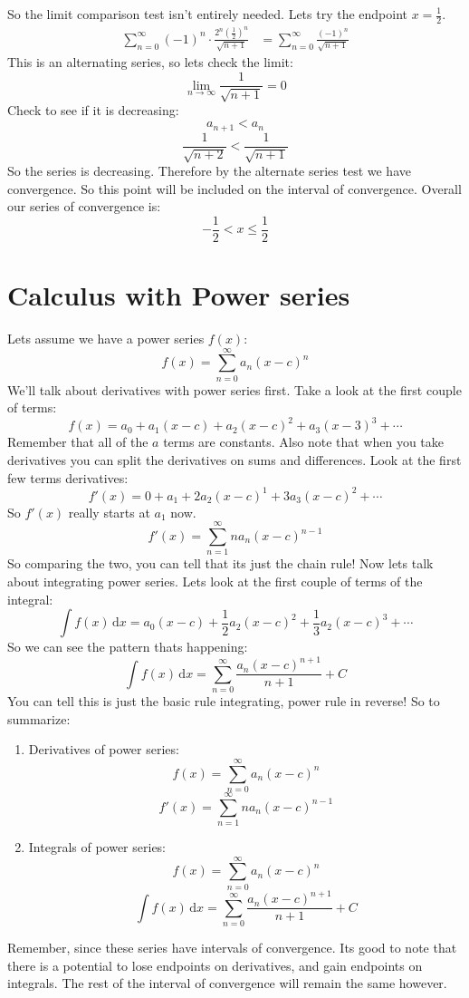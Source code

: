 \documentclass{article}
\begin{document}
        So the limit comparison test isn't entirely needed. 
        Lets try the endpoint \(x = \frac{1}{2}\).
        \begin{align*}
            \sum_{n=0}^{\infty} (-1)^n \cdot \frac{2^n(\frac{1}{2})^n}{\sqrt{n+1}}
            &= \sum_{n=0}^{\infty} \frac{(-1)^n}{\sqrt{n+1}}
        \end{align*}
        This is an alternating series, so lets check the limit:
        \[\lim_{n \to \infty} \frac{1}{\sqrt{n+1}} = 0\]
        Check to see if it is decreasing:
        \[a_{n+1} < a_n\]
        \[\frac{1}{\sqrt{n+2}} < \frac{1}{\sqrt{n+1}}\]
        So the series is decreasing. 
        Therefore by the alternate series test we have convergence.
        So this point will be included on the interval of convergence.
        Overall our series of convergence is:
        \[- \frac{1}{2} < x \leq \frac{1}{2}\]

\section{Calculus with Power series}
    Lets assume we have a power series \(f(x)\):
    \[f(x) = \sum_{n=0}^{\infty} a_n (x-c)^n\]
    We'll talk about derivatives with power series first.
    Take a look at the first couple of terms:
    \[f(x) = a_0 + a_1(x-c) + a_2(x-c)^2 + a_3(x-3)^3 + \cdots\]
    Remember that all of the \(a\) terms are constants.
    Also note that when you take derivatives you can split the derivatives on sums and differences.
    Look at the first few terms derivatives:
    \[f'(x) = 0 + a_1 + 2a_2(x-c)^1 + 3a_3(x-c)^2 + \cdots\]
    So \(f'(x)\) really starts at \(a_1\) now.
    \[f'(x) = \sum_{n = 1}^{\infty} na_n(x-c)^{n-1}\]
    So comparing the two, you can tell that its just the chain rule!
    Now lets talk about integrating power series.
    Lets look at the first couple of terms of the integral:
    \[\int f(x) \,\mathrm{d}x = a_0(x-c) + \frac{1}{2}a_2(x-c)^2 + \frac{1}{3}a_2(x-c)^3 + \cdots\]
    So we can see the pattern thats happening:
    \[\int f(x) \,\mathrm{d}x = \sum_{n=0}^{\infty} \frac{a_n(x-c)^{n+1}}{n+1} + C\]
    You can tell this is just the basic rule integrating, power rule in reverse!
    So to summarize:
    \begin{enumerate}
        \item Derivatives of power series:
        \[f(x) = \sum_{n=0}^{\infty} a_n (x-c)^n\]
        \[f'(x) = \sum_{n = 1}^{\infty} na_n(x-c)^{n-1}\]
        \item Integrals of power series:
        \[f(x) = \sum_{n=0}^{\infty} a_n (x-c)^n\]
        \[\int f(x) \,\mathrm{d}x = \sum_{n=0}^{\infty} \frac{a_n(x-c)^{n+1}}{n+1} + C\]
    \end{enumerate}
    Remember, since these series have intervals of convergence.
    Its good to note that there is a potential to lose endpoints on derivatives, and gain endpoints on integrals.
    The rest of the interval of convergence will remain the same however.
    
\end{document}
